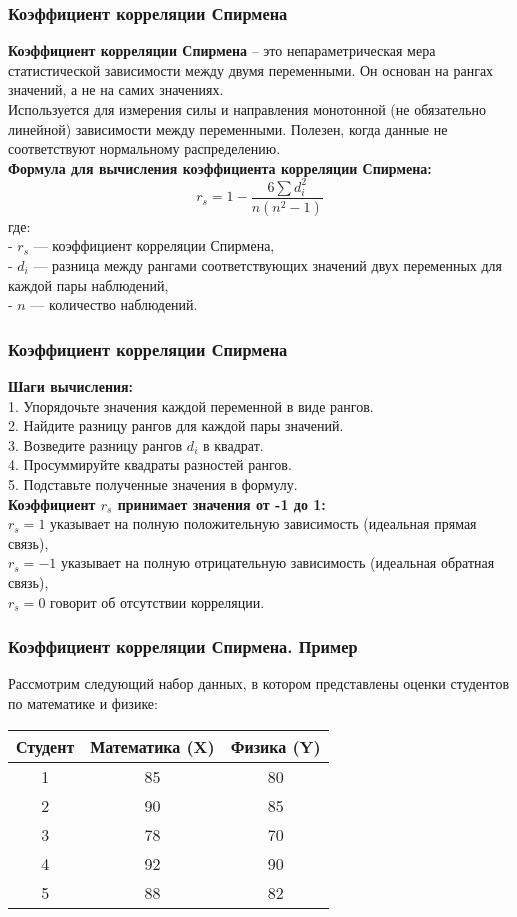 \documentclass[aspectratio=169]{beamer}
\begin{document}
\begin{frame}
\frametitle{Коэффициент корреляции Спирмена}
{\bf Коэффициент корреляции Спирмена} -- это непараметрическая мера статистической зависимости между двумя переменными. Он основан на рангах значений, а не на самих значениях.\\
Используется для измерения силы и направления монотонной (не обязательно линейной) зависимости между переменными. Полезен, когда данные не соответствуют нормальному распределению.\\
{\bf Формула для вычисления коэффициента корреляции Спирмена:}\\
\[
r_s = 1 - \frac{6 \sum d_i^2}{n(n^2 - 1)}
\]
где:\\
- \( r_s \) — коэффициент корреляции Спирмена,\\
- \( d_i \) — разница между рангами соответствующих значений двух переменных для каждой пары наблюдений,\\
- \( n \) — количество наблюдений.
\end{frame}

\begin{frame}
\frametitle{Коэффициент корреляции Спирмена}
{\bf Шаги вычисления:}\\
1. Упорядочьте значения каждой переменной в виде рангов.\\
2. Найдите разницу рангов для каждой пары значений.\\
3. Возведите разницу рангов \( d_i \) в квадрат.\\
4. Просуммируйте квадраты разностей рангов.\\
5. Подставьте полученные значения в формулу.
\newline\\
{\bf Коэффициент \( r_s \) принимает значения от -1 до 1:}\\
\quad \( r_s = 1 \) указывает на полную положительную зависимость (идеальная прямая связь),\\
\quad \( r_s = -1 \) указывает на полную отрицательную зависимость (идеальная обратная связь),\\
\quad \( r_s = 0 \) говорит об отсутствии корреляции.
\end{frame}

\begin{frame}
\frametitle{Коэффициент корреляции Спирмена. Пример}
Рассмотрим следующий набор данных, в котором представлены оценки студентов по математике и физике:
\begin{center}
\begin{tabular}{ |c|c|c| } 
 \hline
Студент & Математика (X) & Физика (Y)\\ 
 \hline
 1 & 85 & 80\\
 \hline
 2 & 90 & 85\\
 \hline
 3 & 78 & 70\\
 \hline
 4 & 92 & 90\\
 \hline
 5 & 88 & 82\\
 \hline
\end{tabular}
\end{center}
\end{frame}
\end{document}
